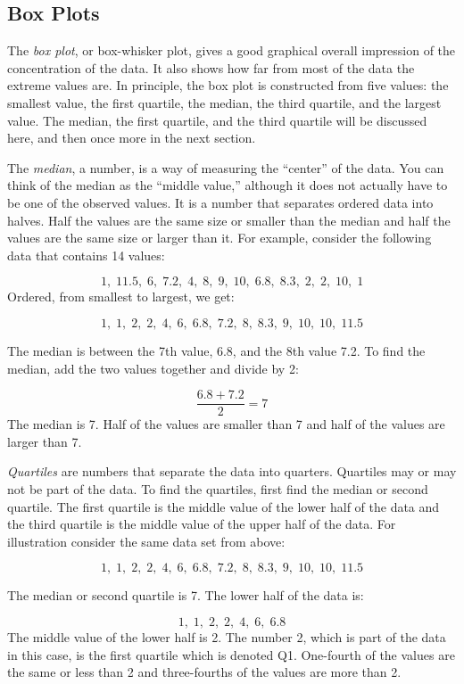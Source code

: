 \documentclass[]{krantz}
\theoremstyle{definition}
\theoremstyle{definition}
\theoremstyle{definition}
\theoremstyle{remark}
\begin{document}
\subsection{Box Plots}\label{box-plots}

The \emph{box plot}, or box-whisker plot, gives a good graphical overall
impression of the concentration of the data. It also shows how far from
most of the data the extreme values are. In principle, the box plot is
constructed from five values: the smallest value, the first quartile,
the median, the third quartile, and the largest value. The median, the
first quartile, and the third quartile will be discussed here, and then
once more in the next section.

The \emph{median}, a number, is a way of measuring the ``center'' of the
data. You can think of the median as the ``middle value,'' although it
does not actually have to be one of the observed values. It is a number
that separates ordered data into halves. Half the values are the same
size or smaller than the median and half the values are the same size or
larger than it. For example, consider the following data that contains
14 values:

\[1,\;   11.5,\;   6,\;   7.2,\;   4,\;   8,\;   9,\;   10,\;   6.8,\;   8.3,\;   2,\;   2,\;   10,\;   1\]
Ordered, from smallest to largest, we get:

\[1,\;   1,\;   2,\;   2,\;   4,\;   6,\;   6.8,\;   7.2,\;   8,\;   8.3,\;   9,\;   10,\;   10,\;   11.5\]

The median is between the 7th value, 6.8, and the 8th value 7.2. To find
the median, add the two values together and divide by 2:

\[\frac{6.8+7.2}{2} = 7\] The median is 7. Half of the values are
smaller than 7 and half of the values are larger than 7.

\emph{Quartiles} are numbers that separate the data into quarters.
Quartiles may or may not be part of the data. To find the quartiles,
first find the median or second quartile. The first quartile is the
middle value of the lower half of the data and the third quartile is the
middle value of the upper half of the data. For illustration consider
the same data set from above:

\[1,\;   1,\;   2,\;   2,\;   4,\;   6,\;   6.8,\;   7.2,\;   8,\;   8.3,\;   9,\;   10,\;   10,\;   11.5\]

The median or second quartile is 7. The lower half of the data is:

\[1,\;   1,\;   2,\;   2,\;   4,\;   6,\;   6.8\] The middle value of
the lower half is 2. The number 2, which is part of the data in this
case, is the first quartile which is denoted Q1. One-fourth of the
values are the same or less than 2 and three-fourths of the values are
more than 2.
\end{document}
